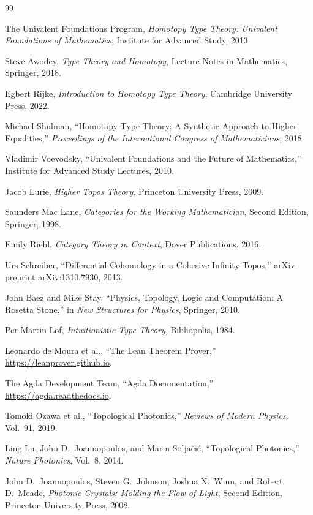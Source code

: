 \documentclass[11pt,openany]{book}
\theoremstyle{definition}
\theoremstyle{plain}
\begin{document}
\begin{thebibliography}{99}

The Univalent Foundations Program,
\textit{Homotopy Type Theory: Univalent Foundations of Mathematics},
Institute for Advanced Study, 2013.

Steve Awodey,
\textit{Type Theory and Homotopy},
Lecture Notes in Mathematics, Springer, 2018.

Egbert Rijke,
\textit{Introduction to Homotopy Type Theory},
Cambridge University Press, 2022.

Michael Shulman,
``Homotopy Type Theory: A Synthetic Approach to Higher Equalities,''
\textit{Proceedings of the International Congress of Mathematicians}, 2018.

Vladimir Voevodsky,
``Univalent Foundations and the Future of Mathematics,''
Institute for Advanced Study Lectures, 2010.

Jacob Lurie,
\textit{Higher Topos Theory},
Princeton University Press, 2009.

Saunders Mac Lane,
\textit{Categories for the Working Mathematician}, Second Edition,
Springer, 1998.

Emily Riehl,
\textit{Category Theory in Context},
Dover Publications, 2016.

Urs Schreiber,
``Differential Cohomology in a Cohesive Infinity-Topos,''
arXiv preprint arXiv:1310.7930, 2013.

John Baez and Mike Stay,
``Physics, Topology, Logic and Computation: A Rosetta Stone,''
in \textit{New Structures for Physics}, Springer, 2010.

Per Martin-L\"of,
\textit{Intuitionistic Type Theory},
Bibliopolis, 1984.

Leonardo de Moura et al.,
``The Lean Theorem Prover,'' \url{https://leanprover.github.io}.

The Agda Development Team,
``Agda Documentation,'' \url{https://agda.readthedocs.io}.

Tomoki Ozawa et al.,
``Topological Photonics,''
\textit{Reviews of Modern Physics}, Vol.~91, 2019.

Ling Lu, John D.\ Joannopoulos, and Marin Solja\v{c}i\'c,
``Topological Photonics,''
\textit{Nature Photonics}, Vol.~8, 2014.

John D.\ Joannopoulos, Steven G.\ Johnson, Joshua N.\ Winn, and Robert D.\ Meade,
\textit{Photonic Crystals: Molding the Flow of Light}, Second Edition,
Princeton University Press, 2008.


\end{thebibliography}
\end{document}
